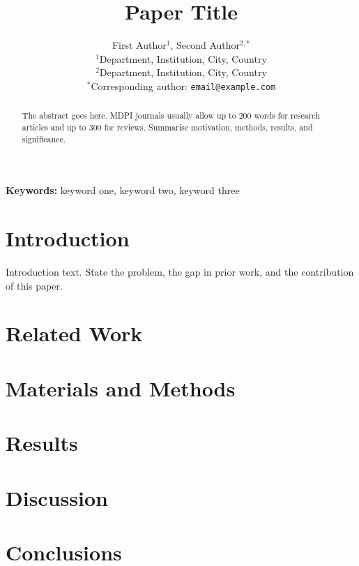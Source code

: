 \documentclass[a4paper,10pt]{article}
\title{Paper Title}
\author{First Author$^{1}$, Second Author$^{2,*}$\\
$^{1}$Department, Institution, City, Country\\
$^{2}$Department, Institution, City, Country\\
$^{*}$Corresponding author: \texttt{email@example.com}}
\date{}
\begin{document}
\maketitle

\begin{abstract}
The abstract goes here. MDPI journals usually allow up to 200 words for research articles and up to 300 for reviews. Summarise motivation, methods, results, and significance.
\end{abstract}

\noindent\textbf{Keywords:} keyword one, keyword two, keyword three

\section{Introduction}
\label{sec:introduction}

Introduction text. State the problem, the gap in prior work, and the contribution of this paper.

\section{Related Work}
\label{sec:related}

\section{Materials and Methods}
\label{sec:method}

\section{Results}
\label{sec:results}

\section{Discussion}
\label{sec:discussion}

\section{Conclusions}
\label{sec:conclusion}



\end{document}
